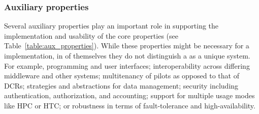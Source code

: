 \documentclass{sig-alternate}
\begin{document}
\subsubsection{Auxiliary properties}
\label{sec:auxprops}

Several auxiliary properties play an important role in supporting the
implementation and usability of the core properties (see
Table~\ref{table:aux_properties}). While these properties might be necessary for
a \pilot implementation, in of themselves they do not distinguish a \pilot as a
unique system. For example, programming and user interfaces; interoperability
across differing middleware and other \pilot systems; multitenancy of pilots as
opposed to that of DCRs; strategies and abstractions for data management;
security including authentication, authorization, and accounting; support for
multiple usage modes like HPC or HTC; or robustness in terms of fault-tolerance
and high-availability.
\end{document}
